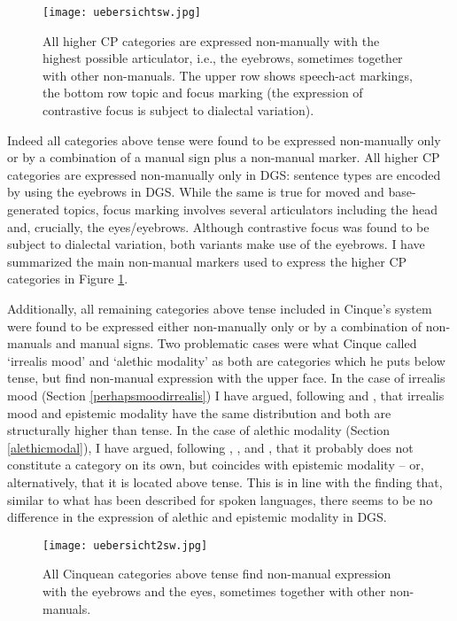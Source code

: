 \begin{figure}[bt]
\centering
	\texttt{[image: uebersichtsw.jpg]}
	\caption{All higher CP categories are expressed non-manually with the highest possible articulator, i.e., the eyebrows, sometimes together with other non-manuals. The upper row shows speech-act markings, the bottom row topic and focus marking (the expression of contrastive focus is subject to dialectal variation).}
	\label{highercpcategories}
\end{figure}

Indeed all categories above tense were found to be expressed non-manually only or by a combination of a manual sign plus a non-manual marker. All higher CP categories are expressed non-manually only in DGS: sentence types are encoded by using the eyebrows in DGS. While the same is true for moved and base-generated topics, focus marking involves several articulators including the head and, crucially, the eyes/eyebrows. Although contrastive focus was found to be subject to dialectal variation, both variants make use of the eyebrows. I have summarized the main non-manual markers used to express the higher CP categories in Figure \ref{highercpcategories}.

Additionally, all remaining categories above tense included in Cinque's system were found to be expressed either non-manually only or by a combination of non-manuals and manual signs. Two problematic cases were what Cinque called `irrealis mood' and `alethic modality' as both are categories which he puts below tense, but find non-manual expression with the upper face. In the case of irrealis mood (Section \ref{perhapsmoodirrealis}) I have argued, following \citet{nordstrom2010modality} and \citet{zyman2012two}, that irrealis mood and epistemic modality have the same distribution and both are structurally higher than tense. In the case of alethic modality (Section \ref{alethicmodal}), I have argued, following \citet{palmer1986mood}, \citet{nuyts2000epistemic}, and \citet{von2006modality}, that it probably does not constitute a category on its own, but coincides with epistemic modality -- or, alternatively, that it is located above tense. This is in line with the finding that, similar to what has been described for spoken languages, there seems to be no difference in the expression of alethic and epistemic modality in DGS.

\begin{figure}[bt]
\centering
	\texttt{[image: uebersicht2sw.jpg]}
	\caption{All Cinquean categories above tense find non-manual expression with the eyebrows and the eyes, sometimes together with other non-manuals.}
	\label{lowercpcategories}
\end{figure}

